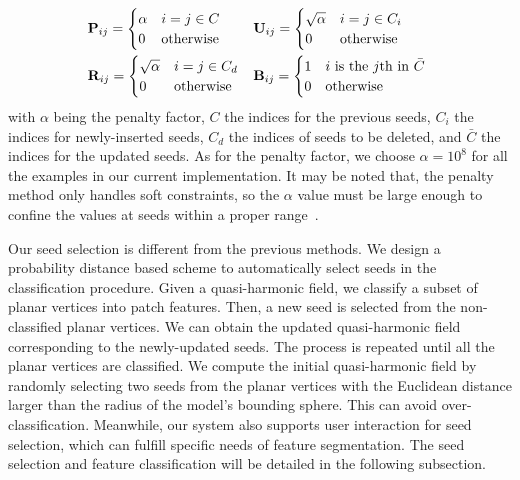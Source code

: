 \documentclass[10pt,journal,cspaper,compsoc]{IEEEtran}
\begin{document}
\begin{displaymath}
\begin{aligned}
&\textbf{P}_{ij} = \begin{cases}
                         \alpha  & \hbox{$i=j\in C$}\\
                         0 & \hbox{otherwise} \\
                       \end{cases}
&&\textbf{U}_{ij} =\begin{cases}
                         \sqrt{\alpha}  & \hbox{$i=j\in C_{i}$}\\
                         0 & \hbox{otherwise} \\
                       \end{cases} \\
&\textbf{R}_{ij}=\begin{cases}
                            \sqrt{\alpha}  & \hbox{$i=j\in C_{d}$}\\
                         0 & \hbox{otherwise} \\
                       \end{cases}
&&\textbf{B}_{ij} =\begin{cases}
                         1  & \hbox{$i$ is the $j$th in $\bar{C}$ }\\
                         0 & \hbox{otherwise} \\
                       \end{cases}
 \end{aligned}
\end{displaymath}
with $\alpha$ being the penalty factor, $C$ the indices for the
previous seeds, $C_{i}$ the indices for newly-inserted seeds, $C_{d}$
the indices of seeds to be deleted, and $\bar{C}$ the indices for the
updated seeds. As for the penalty factor, we choose $\alpha=10^8$ for
all the examples in our current implementation. It may be noted that,
the penalty method only handles soft constraints, so the $\alpha$
value must be large enough to confine the values at seeds within a
proper range~\cite{XZCX09}.


Our seed selection is different from the previous methods. We design a
probability distance based scheme to automatically select seeds in the
classification procedure. Given a quasi-harmonic field, we classify a
subset of planar vertices into patch features. Then, a new seed is
selected from the non-classified planar vertices. We can obtain the
updated quasi-harmonic field corresponding to the newly-updated
seeds. The process is repeated until all the planar vertices are
classified. We compute the initial quasi-harmonic field by randomly
selecting two seeds from the planar vertices with the Euclidean
distance larger than the radius of the model's bounding sphere. This
can avoid over-classification. Meanwhile, our system also supports
user interaction for seed selection, which can fulfill specific needs
of feature segmentation. The seed selection and feature classification
will be detailed in the following subsection.
\end{document}
